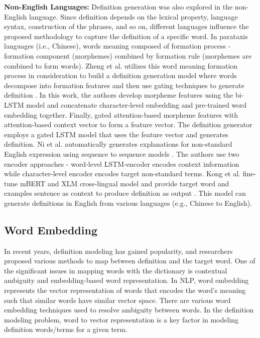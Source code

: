 \textbf{Non-English Languages:} Definition generation was also explored in the
non-English language. Since definition depends on the lexical property, language
syntax, construction of the phrases, and so on, different languages influence
the proposed methodology to capture the definition of a specific word. In
parataxis languages (i.e., Chinese), words meaning composed of formation process
- formation component (morphemes) combined by formation rule (morphemes are
combined to form words). Zheng et al. utilizes this word meaning formation
process in consideration to build a definition generation model where words
decompose into formation features and then use gating techniques to generate
definition \cite{zheng_decompose_2021}. In this work, the authors develop
morpheme features using the bi-LSTM model and concatenate character-level
embedding and pre-trained word embedding together. Finally, gated
attention-based morpheme features with attention-based context vector to form a
feature vector. The definition generator employs a gated LSTM model that uses
the feature vector and generates definition. Ni et al. automatically generates
explanations for non-standard English expression using sequence to sequence
models \cite{ni_learning_2017}. The authors use two encoder approaches -
word-level LSTM-encoder encodes context information while character-level
encoder encodes target non-standard terms. Kong et al. fine-tune mBERT and XLM
cross-lingual model and provide target word and examples sentence as context to
produce definition as output \cite{kong_toward_2020}. This model can generate
definitions in English from various languages (e.g., Chinese to English).

\subsection{Word Embedding}
In recent years, definition modeling has gained popularity, and researchers
proposed various methods to map between definition and the target word. One of
the significant issues in mapping words with the dictionary is contextual
ambiguity and embedding-based word representation. In NLP, word embedding
represents the vector representation of words that encodes the word's meaning
such that similar words have similar vector space. There are various word
embedding techniques used to resolve ambiguity between words. In the definition
modeling problem, word to vector representation is a key factor in modeling
definition words/terms for a given term.

